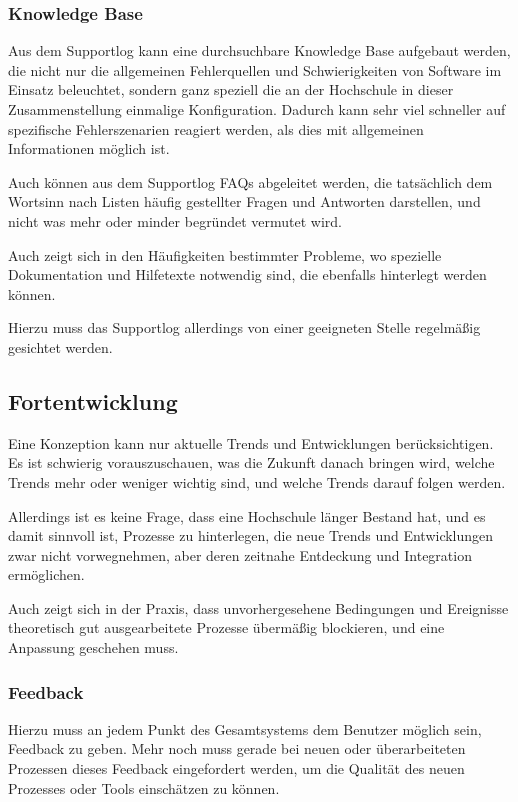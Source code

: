 \subsubsection{Knowledge Base}
Aus dem Supportlog kann eine durchsuchbare Knowledge Base aufgebaut werden, die nicht nur die allgemeinen Fehlerquellen und Schwierigkeiten von Software im Einsatz beleuchtet, sondern ganz speziell die an der Hochschule in dieser Zusammenstellung einmalige Konfiguration.
Dadurch kann sehr viel schneller auf spezifische Fehlerszenarien reagiert werden, als dies mit allgemeinen Informationen möglich ist.

Auch können aus dem Supportlog FAQs abgeleitet werden, die tatsächlich dem Wortsinn nach Listen häufig gestellter Fragen und Antworten darstellen, und nicht was mehr oder minder begründet vermutet wird.

Auch zeigt sich in den Häufigkeiten bestimmter Probleme, wo spezielle Dokumentation und Hilfetexte notwendig sind, die ebenfalls hinterlegt werden können.

Hierzu muss das Supportlog allerdings von einer geeigneten Stelle regelmäßig gesichtet werden.

\subsection{Fortentwicklung}
Eine Konzeption kann nur aktuelle Trends und Entwicklungen berücksichtigen. Es ist schwierig vorauszuschauen, was die Zukunft danach bringen wird, welche Trends mehr oder weniger wichtig sind, und welche Trends darauf folgen werden.

Allerdings ist es keine Frage, dass eine Hochschule länger Bestand hat, und es damit sinnvoll ist, Prozesse zu hinterlegen, die neue Trends und Entwicklungen zwar nicht vorwegnehmen, aber deren zeitnahe Entdeckung und Integration ermöglichen.

Auch zeigt sich in der Praxis, dass unvorhergesehene Bedingungen und Ereignisse theoretisch gut ausgearbeitete Prozesse übermäßig blockieren, und eine Anpassung geschehen muss.

\subsubsection{Feedback}
\label{feedback}
Hierzu muss an jedem Punkt des Gesamtsystems dem Benutzer möglich sein, Feedback zu geben. Mehr noch muss gerade bei neuen oder überarbeiteten Prozessen dieses Feedback eingefordert werden, um die Qualität des neuen Prozesses oder Tools einschätzen zu können.

